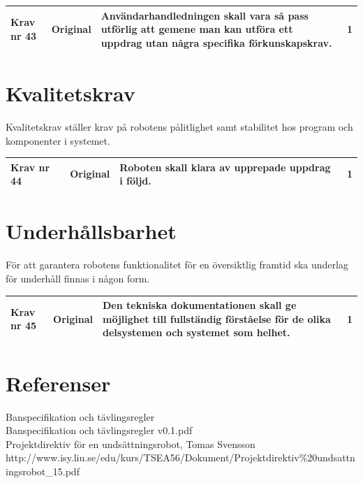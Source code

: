 \documentclass[11pt]{article}
\begin{document}
\begin{flushleft}
\begin{center}
\begin{longtable}{|l|l|p{.70\linewidth}|l|} \hline

Krav nr 43 &
Original &
Användarhandledningen skall vara så pass utförlig att gemene man kan utföra ett uppdrag utan några specifika förkunskapskrav. &
1 \\ \hline

\end{longtable}
\end{center}

\section{Kvalitetskrav}
Kvalitetskrav ställer krav på robotens pålitlighet samt stabilitet hos program och komponenter i systemet.

\begin{center}
\begin{longtable}{|l|l|p{.70\linewidth}|l|} \hline

Krav nr 44 &
Original &
Roboten skall klara av upprepade uppdrag i följd. &
1 \\ \hline

\end{longtable}
\end{center}

\section{Underhållsbarhet}
För att garantera robotens funktionalitet för en översiktlig framtid ska underlag för underhåll finnas i någon form.

\begin{center}
\begin{longtable}{|l|l|p{.70\linewidth}|l|} \hline
Krav nr 45 &
Original &
Den tekniska dokumentationen skall ge möjlighet till fullständig förståelse för de olika delsystemen och systemet som helhet. &
1 \\ \hline

\end{longtable}
\end{center}



\setcounter{secnumdepth}{0}
\pagebreak
\section{Referenser}
Banspecifikation och tävlingsregler \\
Banspecifikation och tävlingsregler v0.1.pdf
\\[0.1in]
Projektdirektiv för en undsättningsrobot, Tomas Svensson
http://www.isy.liu.se/edu/kurs/TSEA56/Dokument/Projektdirektiv\%20undsattningsrobot\_15.pdf

\setcounter{secnumdepth}{2}



\end{flushleft}
\end{document}

